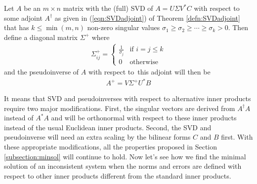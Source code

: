 \begin{defn}
Let $A$ be an $m \times n$ matrix with the (full) SVD of $A = U\Sigma V^*C$ with respect to some adjoint $A^\dag$ as given in (\ref{eqn:SVDadjoint}) of Theorem \ref{defn:SVDadjoint} that has $k \leq \min(m,n)$ non-zero singular values $\sigma_1 \geq \sigma_2 \geq \cdots \geq \sigma_k > 0$. Then define a diagonal matrix $\Sigma^+$ where
\begin{align}
\Sigma^+_{ij} = \begin{cases}
\frac{1}{\sigma_j} & \text{if $i = j \leq k$} \\
0 & \text{otherwise}
\end{cases}
\end{align}
and the pseudoinverse of $A$ with respect to this adjoint will then be
\begin{align}
A^+ = V \Sigma^+ U^* B \label{eqn:pinvadjoint}
\end{align}
\end{defn}
It means that SVD and pseudoinverses with respect to alternative inner products require two major modifications. First, the singular vectors are derived from $A^\dag A$ instead of $A^* A$ and will be orthonormal with respect to these inner products instead of the usual Euclidean inner products. Second, the SVD and pseudoinverse will need an extra scaling by the bilinear forms $C$ and $B$ first. With these appropriate modifications, all the properties proposed in Section \ref{subsection:minsol} will continue to hold. Now let's see how we find the minimal solution of an inconsistent system when the norms and errors are defined with respect to other inner products different from the standard inner products.
